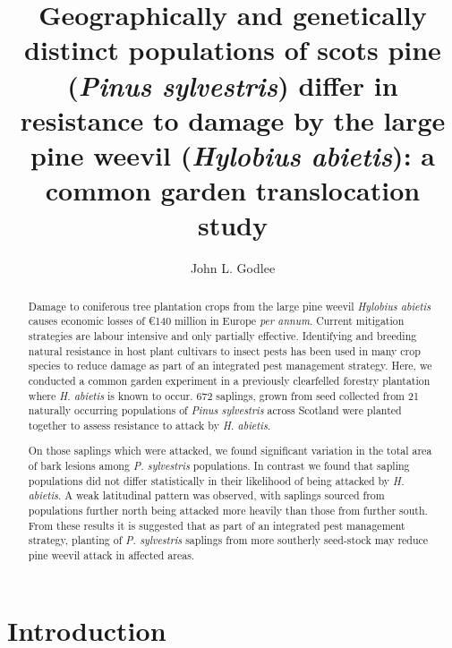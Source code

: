 \documentclass[a4paper, 11pt]{article}
\title{Geographically and genetically distinct populations of scots pine (\textit{Pinus sylvestris}) differ in resistance to damage by the large pine weevil (\textit{Hylobius abietis}): a common garden translocation study}
\author{John L. Godlee}
\begin{document}

\maketitle{}

\begin{abstract}

	Damage to coniferous tree plantation crops from the large pine weevil \textit{Hylobius abietis} causes economic losses of \euro{}140 million in Europe \textit{per annum}. Current mitigation strategies are labour intensive and only partially effective. Identifying and breeding natural resistance in host plant cultivars to insect pests has been used in many crop species to reduce damage as part of an integrated pest management strategy. Here, we conducted a common garden experiment in a previously clearfelled forestry plantation where \textit{H. abietis} is known to occur. 672 saplings, grown from seed collected from 21 naturally occurring populations of \textit{Pinus sylvestris} across Scotland were planted together to assess resistance to attack by \textit{H. abietis}.

	On those saplings which were attacked, we found significant variation in the total area of bark lesions among \textit{P. sylvestris} populations. In contrast we found that sapling populations did not differ statistically in their likelihood of being attacked by \textit{H. abietis}. A weak latitudinal pattern was observed, with saplings sourced from populations further north being attacked more heavily than those from further south. From these results it is suggested that as part of an integrated pest management strategy, planting of \textit{P. sylvestris} saplings from more southerly seed-stock may reduce pine weevil attack in affected areas.



\end{abstract}

\section*{Introduction}
\end{document}
